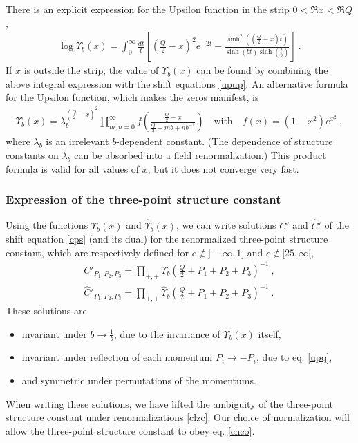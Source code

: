 \documentclass[12pt, a4paper, notitlepage, twoside]{report}
\numberwithin{equation}{section}
\theoremstyle{break}
\begin{document}
There is an explicit expression for the Upsilon function in the strip $0<\Re x<\Re Q$, 
\begin{align}
 \log\Upsilon_b(x) = \int_0^\infty \frac{dt}{t} \left[\left(\tfrac{Q}{2}-x\right)^2 e^{-2t} -\frac{\sinh^2\left(\left(\frac{Q}{2}-x\right)\!t\right)}{\sinh (bt)\sinh\left(\frac{t}{b}\right)}\right]\ .
\label{lup}
\end{align}
If $x$ is outside the strip, the value of $\Upsilon_b(x)$ can be found by combining the above integral expression with the shift equations \eqref{upup}.
An alternative formula for the Upsilon function, which makes the zeros manifest, is 
\begin{align}
 \Upsilon_b(x) = \lambda_b^{(\frac{Q}{2}-x)^2}\prod_{m,n=0}^\infty f\left(\frac{\frac{Q}{2}-x}{\frac{Q}{2}+mb+nb^{-1}}\right) \quad \text{with} \quad f(x)=(1-x^2)e^{x^2}\ ,
\end{align}
where $\lambda_b$ is an irrelevant $b$-dependent constant. (The dependence of structure constants on $\lambda_b$ can be absorbed into a field renormalization.)
This product formula is valid for all values of $x$, but it does not converge very fast.

\subsubsection{Expression of the three-point structure constant}

Using the functions $\Upsilon_b(x)$ and $\hat\Upsilon_b(x)$, we can write solutions $C'$ and $\hat C'$ of the shift equation \eqref{cps} (and its dual) for the renormalized three-point structure constant, which are respectively defined for $c\notin ]-\infty, 1]$ and $c\notin [25,\infty[$,
\begin{align}
 \boxed{C'_{P_1,P_2,P_3} = \prod_{\pm,\pm} \Upsilon_b\left(\tfrac{Q}{2}+P_1\pm P_2 \pm P_3\right)^{-1} }\ ,
 \label{cp}
 \\
 \boxed{\hat C'_{P_1,P_2,P_3} = \prod_{\pm,\pm} \hat\Upsilon_b\left(\tfrac{Q}{2}+P_1\pm P_2 \pm P_3\right)^{-1}}\ .
 \label{hcp}
\end{align}
These solutions are 
\begin{itemize}
 \item invariant under $b\to \frac{1}{b}$, due to the invariance of $\Upsilon_b(x)$ itself,
 \item invariant under reflection of each momentum $P_i\to -P_i$, due to eq. \eqref{upq},
 \item and symmetric under permutations of the momentums.
\end{itemize}
When writing these solutions, we have lifted the ambiguity of the three-point structure constant under renormalizations \eqref{clzc}. Our choice of normalization will allow the three-point structure constant to obey eq. \eqref{chco}.
\end{document}
